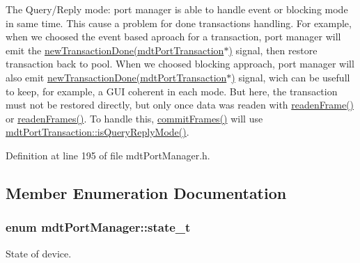 The Query/Reply mode: port manager is able to handle event or blocking mode in same time. This cause a problem for done transactions handling. For example, when we choosed the event based aproach for a transaction, port manager will emit the \hyperlink{classmdt_port_manager_a416a24db1048e9f66aef27ea810954d2}{newTransactionDone(mdtPortTransaction$\ast$)} signal, then restore transaction back to pool. When we choosed blocking approach, port manager will also emit \hyperlink{classmdt_port_manager_a416a24db1048e9f66aef27ea810954d2}{newTransactionDone(mdtPortTransaction$\ast$)} signal, wich can be usefull to keep, for example, a GUI coherent in each mode. But here, the transaction must not be restored directly, but only once data was readen with \hyperlink{classmdt_port_manager_a830ae182d06dd6a52c43a7f45b9240ac}{readenFrame()} or \hyperlink{classmdt_port_manager_addd5dcae9644cea42a9871205af41796}{readenFrames()}. To handle this, \hyperlink{classmdt_port_manager_a84d37b380080eb26e56c68424dedd958}{commitFrames()} will use \hyperlink{classmdt_port_transaction_a9da1cc7a191cd21a2e532d277aa3c628}{mdtPortTransaction::isQueryReplyMode()}. 

Definition at line 195 of file mdtPortManager.h.



\subsection{Member Enumeration Documentation}
\hypertarget{classmdt_port_manager_a9448339d7f08ca5e18b904df25b382da}{
\subsubsection[{state\_\-t}]{\setlength{\rightskip}{0pt plus 5cm}enum {\bf mdtPortManager::state\_\-t}}}
\label{classmdt_port_manager_a9448339d7f08ca5e18b904df25b382da}


State of device. 


